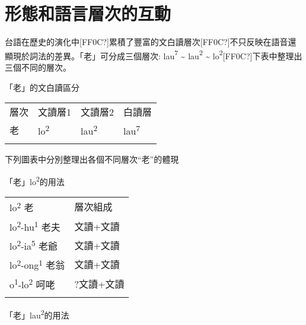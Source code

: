 \section{\rmfamily 形態和語言層次的互動}

\textrm{台語在歷史的演化中[FF0C?]累積了豐富的文白讀層次[FF0C?]不只反映在語音還顯現於詞法的差異。「老」可分成三個層次: lau}\textrm{\textsuperscript{7}} \textrm{{\textasciitilde} lau}\textrm{\textsuperscript{2}} \textrm{{\textasciitilde} lo}\textrm{\textsuperscript{2}}[FF0C?]\textrm{下表中整理出三個不同的層次。}

 \textrm{「老」}的文白讀區分

\tablefirsthead{}

\tabletail{}
\tablelasttail{}
\begin{tabularx}{\textwidth}{XXXX}
\lsptoprule

 層次 & 文讀層1 & 文讀層2 & 白讀層\\
 老 & {\sffamily \textrm{lo}\textrm{\textsuperscript{2}}} & {\sffamily \textrm{lau}\textrm{\textsuperscript{2}}} & {\sffamily \textrm{lau}\textrm{\textsuperscript{7}}}\\
\lspbottomrule
\end{tabularx}
\rmfamily
下列圖表中分別整理出各個不同層次“老”的體現

 \textrm{「老」lo}\textrm{\textsuperscript{2}}的用法

\tablefirsthead{}

\tabletail{}
\tablelasttail{}
\begin{tabularx}{\textwidth}{XX}
\lsptoprule

{\sffamily \textrm{lo}\textrm{\textsuperscript{2}} \textrm{老}} & 層次組成\\
{\sffamily \textrm{lo}\textrm{\textsuperscript{2}}\textrm{{}-hu}\textrm{\textsuperscript{1}} \textrm{老夫}} & 文讀+文讀\\
{\sffamily \textrm{lo}\textrm{\textsuperscript{2}}\textrm{{}-ia}\textrm{\textsuperscript{5}} \textrm{老爺}} & 文讀+文讀\\
{\sffamily \textrm{lo}\textrm{\textsuperscript{2}}\textrm{{}-ong}\textrm{\textsuperscript{1}} \textrm{老翁}} & 文讀+文讀\\
{\sffamily \textrm{o}\textrm{\textsuperscript{1}}\textrm{{}-lo}\textrm{\textsuperscript{2}} \textrm{呵咾} } & ?文讀+文讀\\
\lspbottomrule
\end{tabularx}
 \textrm{「老」lau}\textrm{\textsuperscript{2}}的用法

\tablefirsthead{}

